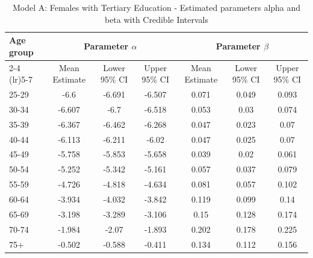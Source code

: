 \begin{landscape}
\begin{table}[htbp]
\centering
\caption{Model A: Females with Tertiary Education - Estimated parameters alpha and beta  with Credible Intervals}
\label{tab:parameters_ab4}
\begin{tabular}{@{}lcccccc@{}}
\toprule
Age group & \multicolumn{3}{c}{Parameter \(\alpha\)} & \multicolumn{3}{c}{Parameter \(\beta\)} \\ 
\cmidrule(lr){2-4} \cmidrule(lr){5-7}
          & Mean Estimate & Lower 95\% CI & Upper 95\% CI & Mean Estimate & Lower 95\% CI & Upper 95\% CI \\ 
\midrule
25-29 & -6.6 & -6.691 & -6.507 & 0.071 & 0.049 & 0.093 \\
30-34 & -6.607 & -6.7 & -6.518 & 0.053 & 0.03 & 0.074 \\
35-39 & -6.367 & -6.462 & -6.268 & 0.047 & 0.023 & 0.07 \\
40-44 & -6.113 & -6.211 & -6.02 & 0.047 & 0.025 & 0.07 \\
45-49 & -5.758 & -5.853 & -5.658 & 0.039 & 0.02 & 0.061 \\
50-54 & -5.252 & -5.342 & -5.161 & 0.057 & 0.037 & 0.079 \\
55-59 & -4.726 & -4.818 & -4.634 & 0.081 & 0.057 & 0.102 \\
60-64 & -3.934 & -4.032 & -3.842 & 0.119 & 0.099 & 0.14 \\
65-69 & -3.198 & -3.289 & -3.106 & 0.15 & 0.128 & 0.174 \\
70-74 & -1.984 & -2.07 & -1.893 & 0.202 & 0.178 & 0.225 \\
75+ & -0.502 & -0.588 & -0.411 & 0.134 & 0.112 & 0.156 \\
\bottomrule
\end{tabular}
\end{table}
\end{landscape}